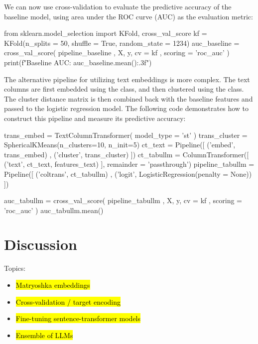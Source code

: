 \documentclass[article]{jss}
\begin{document}
We can now use cross-validation to evaluate the predictive accuracy of the baseline model, using area under the ROC curve (AUC) as the evaluation metric:
\begin{pyblock}
from sklearn.model_selection import KFold, cross_val_score
kf = KFold(n_splits = 50, shuffle = True, random_state = 1234)
auc_baseline = cross_val_score(
    pipeline_baseline
    , X, y, cv = kf
    , scoring = 'roc_auc'
)
print(f"Baseline AUC: {auc_baseline.mean():.3f}")
\end{pyblock}
\stdoutpythontex %

The alternative pipeline for utilizing text embeddings is more complex. The text columns are first embedded using the  class, and then clustered using the  class. The cluster distance matrix is then combined back with the baseline features and passed to the logistic regression model. The following code demonstrates how to construct this pipeline and measure its predictive accuracy:
\begin{pyverbatim}
trans_embed = TextColumnTransformer(
    model_type = 'st'
)
trans_cluster = SphericalKMeans(n_clusters=10, n_init=5)
ct_text = Pipeline([
    ('embed', trans_embed)
    , ('cluster', trans_cluster)
])
ct_tabullm = ColumnTransformer([
    ('text', ct_text, features_text)
], remainder = 'passthrough')
pipeline_tabullm = Pipeline([
    ('coltrans', ct_tabullm)
    , ('logit', LogisticRegression(penalty = None))
])

auc_tabullm = cross_val_score(
    pipeline_tabullm
    , X, y, cv = kf
    , scoring = 'roc_auc'
)
auc_tabullm.mean()
\end{pyverbatim}

\section[Discussion]{Discussion} \label{sec:discussion}

Topics:
\begin{itemize}
  \item \hl{Matryoshka embeddings}
  \item \hl{Cross-validation / target encoding}
  \item \hl{Fine-tuning sentence-transformer models}
  \item \hl{Ensemble of LLMs}
\end{itemize}


\end{document}
